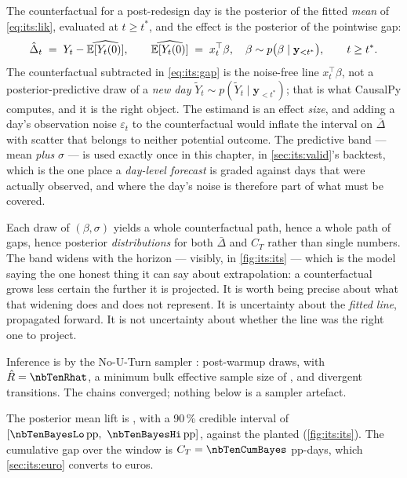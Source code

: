 The counterfactual for a post-redesign day is the posterior of the fitted \emph{mean} of
\cref{eq:its:lik}, evaluated at $t \ge t^{*}$, and the effect is the posterior of the pointwise gap:
%
\begin{equation}
  \hat\Delta_t \;=\; Y_t - \widehat{\operatorname{\mathbb{E}}[Y_t(0)]},
  \qquad \widehat{\operatorname{\mathbb{E}}[Y_t(0)]} \;=\; x_t^{\top}\beta, \quad
         \beta \sim p\big(\beta \mid \mathbf y_{<t^{*}}\big),
  \qquad t \ge t^{*} .
  \label{eq:its:gap}
\end{equation}
%
The counterfactual subtracted in \cref{eq:its:gap} is the noise-free line $x_t^{\top}\beta$, not a
posterior-predictive draw of a \emph{new day} $\tilde Y_t \sim p(\tilde Y_t \mid \mathbf
y_{<t^{*}})$; that is what CausalPy computes, and it is the right object. The estimand is an effect
\emph{size}, and adding a day's observation noise $\varepsilon_t$ to the counterfactual would
inflate the interval on $\bar\Delta$ with scatter that belongs to neither potential outcome. The
predictive band --- mean \emph{plus} $\sigma$ --- is used exactly once in this chapter, in
\cref{sec:its:valid}'s backtest, which is the one place a \emph{day-level forecast} is graded
against days that were actually observed, and where the day's noise is therefore part of what must
be covered.

Each draw of $(\beta, \sigma)$ yields a whole counterfactual path, hence a whole path of gaps,
hence posterior \emph{distributions} for both $\bar\Delta$ and $C_T$ rather than single numbers.
The band widens with the horizon --- visibly, in \cref{fig:its:its} --- which is the model saying
the one honest thing it can say about extrapolation: a counterfactual grows less certain the
further it is projected. It is worth being precise about what that widening does and does not
represent. It is uncertainty about the \emph{fitted line}, propagated forward. It is not
uncertainty about whether the line was the right one to project.

Inference is by the No-U-Turn sampler \citep{hoffman2014}: \nbTenNDraws{} post-warmup draws, with
$\hat R = \nbTenRhat$, a minimum bulk effective sample size of \nbTenEss{} \citep{vehtari2021},
and \nbTenDivergences{} divergent transitions. The chains converged; nothing below is a sampler
artefact.

The posterior mean lift is \pp{\nbTenBayesAvg}, with a 90\,\% credible interval of
$[\pp{\nbTenBayesLo},\ \pp{\nbTenBayesHi}]$, against the planted \pp{+\nbTenTrueLift}
(\cref{fig:its:its}). The cumulative gap over the window is $C_T = \nbTenCumBayes$ pp-days, which
\cref{sec:its:euro} converts to euros.

